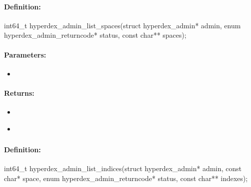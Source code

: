 \paragraph{Definition:}
\begin{ccode}
int64_t hyperdex_admin_list_spaces(struct hyperdex_admin* admin,
        enum hyperdex_admin_returncode* status,
        const char** spaces);
\end{ccode}

\paragraph{Parameters:}
\begin{itemize}[noitemsep]
\item {}\\

\end{itemize}

\paragraph{Returns:}
\begin{itemize}[noitemsep]
\item {}\\

\item {}\\

\end{itemize}

\pagebreak
\subsubsection{}
\label{api:c:list_indices}


\paragraph{Definition:}
\begin{ccode}
int64_t hyperdex_admin_list_indices(struct hyperdex_admin* admin,
        const char* space,
        enum hyperdex_admin_returncode* status,
        const char** indexes);
\end{ccode}

